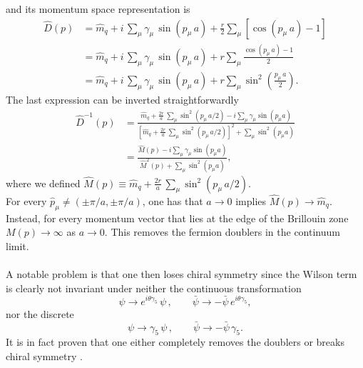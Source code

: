 and its momentum space representation is
\begin{equation*}
    \begin{aligned}
        \widehat{D}(p) &= \hat{m}_q + i \, \sum_\mu \gamma_\mu \, \sin\left( p_\mu \, a\right) + \frac{r}{2} \sum_\mu \left[\cos\left(p_\mu \, a\right) - 1\right] \\
        &= \hat{m}_q + i \, \sum_\mu \gamma_\mu \, \sin\left( p_\mu \, a\right) + r \sum_\mu \frac{\cos\left(p_\mu \, a\right) - 1}{2} \\
        &= \hat{m}_q + i \, \sum_\mu \gamma_\mu \, \sin\left( p_\mu \, a\right) + r \sum_\mu \sin^2\left(\frac{p_\mu \, a}{2}\right).
    \end{aligned}
\end{equation*}
The last expression can be inverted straightforwardly
\begin{equation*}
    \begin{aligned}
        \widehat{D}^{-1}(p) &= \frac{\hat{m}_q + \frac{2r}{a} \, \sum_\mu \sin ^2\left(p_\mu \, a/2\right) - i \sum_\mu \gamma_\mu \sin \left(p_\mu a\right)}{\left[\hat{m}_q + \frac{2r}{a} \, \sum_\mu \sin^2\left(p_\mu \, a / 2\right)\right]^2 + \sum_\mu \sin^2 \left(p_\mu a\right)} \\
        &= \frac{\hat{M}(p) - i \sum_\mu \gamma_\mu \sin \left(p_\mu a\right)}{\hat{M}^2(p) + \sum_\mu \sin^2 \left(p_\mu a\right)},
    \end{aligned}
\end{equation*}
where we defined $\hat{M}(p) \equiv \hat{m}_q + \frac{2r}{a} \, \sum_\mu \sin ^2\left(p_\mu \, a /2\right)$. \\
For every $\hat p_\mu \neq (\pm \pi/a, \pm \pi/a)$, one has that $a \to 0$ implies $\hat{M}(p) \to \hat{m}_q$.\\
Instead, for every momentum vector that lies at the edge of the Brillouin zone $M(p) \to \infty$ as $a \to 0$. This removes the fermion doublers in the continuum limit. \\~\\
A notable problem is that one then loses chiral symmetry since the Wilson term is clearly not invariant under neither the continuous transformation
\begin{equation*}
    \psi \to e^{i \theta \gamma_5} \, \psi \, , \qquad \bar\psi \to - \bar\psi \, e^{i \theta \gamma_5},
\end{equation*}
nor the discrete
\begin{equation*}
    \psi \to \gamma_5 \, \psi \, , \qquad \bar\psi \to - \bar\psi \, \gamma_5.
\end{equation*}
It is in fact proven that one either completely removes the doublers or breaks chiral symmetry \cite{NIELSEN198120}.